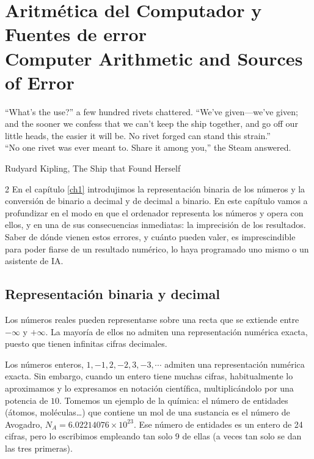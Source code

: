 \chapter{Aritmética del Computador y Fuentes de error\\ Computer Arithmetic and Sources of Error}\label{chp:arit}
\epigraph{``What's the use?'' a few hundred rivets chattered. ``We've given---we've given; and the sooner we confess that we can't keep the ship together, and go off our little heads, the easier it will be. No rivet forged can stand this strain.''\\
 ``No one rivet was ever meant to. Share it among you,'' the Steam answered.}{Rudyard Kipling, The Ship that Found Herself}

\sloppy
\begin{paracol}{2}
En el capítulo \ref{ch1} introdujimos la representación binaria de los números y la conversión de binario a decimal y de decimal a binario. En este capítulo vamos a profundizar en el modo en que el ordenador representa los números y opera con ellos, y en una de sus consecuencias inmediatas: la imprecisión de los resultados. Saber de dónde vienen estos errores, y cuánto pueden valer, es imprescindible para poder fiarse de un resultado numérico, lo haya programado uno mismo o un asistente de IA.

\section{Representación binaria y decimal}

Los números reales pueden representarse sobre una recta que se extiende entre $-\infty$ y $+\infty$. La mayoría de ellos no admiten una representación numérica exacta, puesto que tienen infinitas cifras decimales.

Los números enteros, $1, -1, 2, -2, 3, -3, \cdots$ admiten una representación numérica exacta.  Sin embargo, cuando un entero tiene muchas cifras, habitualmente lo aproximamos y lo expresamos en notación científica, multiplicándolo por una potencia de $10$. Tomemos un ejemplo de la química: el número de entidades (átomos, moléculas\ldots) que contiene un mol de una sustancia es el número de Avogadro, $N_A=6.02214076 \times 10^{23}$. Ese número de entidades es un entero de 24 cifras, pero lo escribimos empleando tan solo 9 de ellas (a veces tan solo se dan las tres primeras).


\end{paracol}
